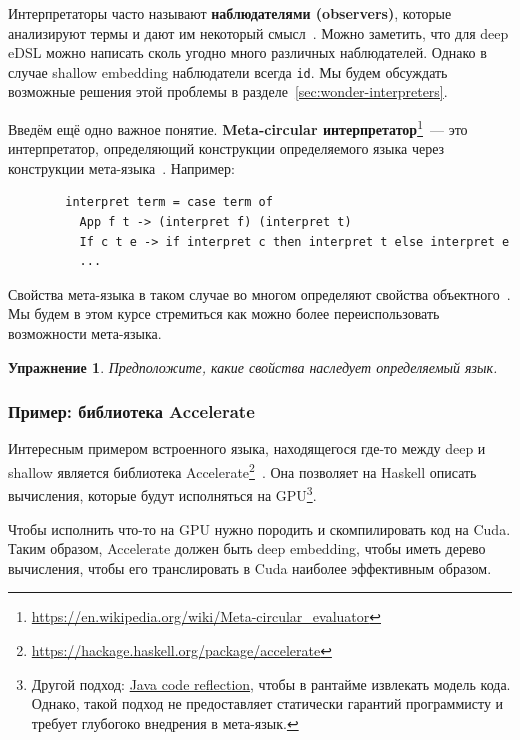 \documentclass[12pt]{article}
\newcommand{\vocab}[1]{\textbf{#1}} %
\newtheorem{task}{Упражнение}
\begin{document}
    Интерпретаторы часто называют \vocab{наблюдателями (observers)}, которые анализируют термы и дают им некоторый смысл~\cite{gibbons2013functional}.
    Можно заметить, что для deep eDSL можно написать сколь угодно много различных наблюдателей.
    Однако в случае shallow embedding наблюдатели всегда \texttt{id}.
    Мы будем обсуждать возможные решения этой проблемы в разделе~\ref{sec:wonder-interpreters}.

    Введём ещё одно важное понятие.
    \vocab{Meta-circular интерпретатор}\footnote{\url{https://en.wikipedia.org/wiki/Meta-circular_evaluator}}~--- это интерпретатор, определяющий конструкции определяемого языка через конструкции мета-языка~\cite{reynolds1972definitional}.
    Например:
    \begin{verbatim}
        interpret term = case term of
          App f t -> (interpret f) (interpret t)
          If c t e -> if interpret c then interpret t else interpret e
          ...
    \end{verbatim}

    Свойства мета-языка в таком случае во многом определяют свойства объектного~\cite{reynolds1972definitional,reynolds1998definitional}.
    Мы будем в этом курсе стремиться как можно более переиспользовать возможности мета-языка.

    \begin{task}
        Предположите, какие свойства наследует определяемый язык.
    \end{task}

    \subsubsection{Пример: библиотека Accelerate}

    Интересным примером встроенного языка, находящегося где-то между deep и shallow является библиотека Accelerate\footnote{\url{https://hackage.haskell.org/package/accelerate}}~\cite[chapter 6]{marlow2011parallel}.
    Она позволяет на Haskell описать вычисления, которые будут исполняться на GPU\footnote{Другой подход: \href{https://youtu.be/6c0DB2kwF_Q?si=-nB7AkCsDWB_Q-hy}{Java code reflection}, чтобы в рантайме извлекать модель кода. Однако, такой подход не предоставляет статически гарантий программисту и требует глубогоко внедрения в мета-язык.}.

    Чтобы исполнить что-то на GPU нужно породить и скомпилировать код на Cuda.
    Таким образом, Accelerate должен быть deep embedding, чтобы иметь дерево вычисления, чтобы его транслировать в Cuda наиболее эффективным образом.
\end{document}
